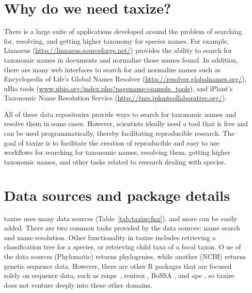 \begin{sloppypar}
\section{Why do we need taxize?}
\label{sec:taxize:why} 
There is a large suite of applications developed around the problem of searching for, resolving, and getting higher taxonomy for species names. 
For example, Linnaeus (\url{http://linnaeus.sourceforge.net/}) provides the ability to search for taxonomic names in documents and normalize those names found. 
In addition, there are many web interfaces to search for and normalize names such as Encyclopedia of Life's Global Names Resolver (\url{http://resolver.globalnames.org/}), uBio tools (\url{www.ubio.org/index.php?pagename=sample_tools}), and iPlant's Taxonomic Name Resolution Service (\url{http://tnrs.iplantcollaborative.org/}). 

All of these data repositories provide ways to search for taxonomic names and resolve them in some cases. 
However, scientists ideally need a tool that is free and can be used programmatically, thereby facilitating reproducible research. 
The goal of taxize is to facilitate the creation of reproducible and easy to use workflows for searching for taxonomic names, resolving them, getting higher taxonomic names, and other tasks related to research dealing with species.

\section{Data sources and package details}
\label{sec:taxize:sources} 
taxize uses many data sources (Table~\ref{tab:taxize:fnx}), and more can be easily added. 
There are two common tasks provided by the data sources: name search and name resolution. 
Other functionality in taxize includes retrieving a classification tree for a species, or retrieving child taxa of a focal taxon. O
ne of the data sources (Phylomatic) returns phylogenies, while another (NCBI) returns genetic sequence data. 
However, there are other R packages that are focused solely on sequence data, such as rsnps~\citep{chamberlain2013}, rentrez \citep{winter2013}, BoSSA \citep{lefeuvre2010}, and ape \citep{paradis2004}, so taxize does not venture deeply into these other domains. 


\end{sloppypar}
